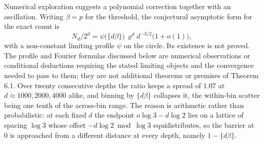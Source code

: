 \documentclass[11pt,a4paper]{article}
\begin{document}
Numerical exploration suggests a polynomial correction together with an
oscillation. Writing \(\beta=p\) for the threshold, the conjectural
asymptotic form for the exact count is \[
N_d/2^d=\psi\bigl(\{d\beta\}\bigr)\,\varrho^{d}d^{-3/2}\bigl(1+o(1)\bigr),
\] with a non-constant limiting profile \(\psi\) on the circle. Its
existence is not proved. The profile and Fourier formulas discussed
below are numerical observations or conditional deductions requiring the
stated limiting objects and the convergence needed to pass to them; they
are not additional theorems or premises of Theorem 6.1. Over twenty
consecutive depths the ratio keeps a spread of \(1.07\) at
\(d\approx1000,2000,4000\) alike, and binning by \(\{d\beta\}\)
collapses it, the within-bin scatter being one tenth of the across-bin
range. The reason is arithmetic rather than probabilistic: at each fixed
\(d\) the endpoint \(o\log3-d\log2\) lies on a lattice of spacing
\(\log3\) whose offset \(-d\log2\bmod\log3\) equidistributes, so the
barrier at \(0\) is approached from a different distance at every depth,
namely \(1-\{d\beta\}\).
\end{document}
